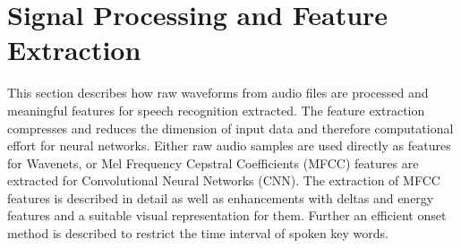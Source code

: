 
\chapter{Signal Processing and Feature Extraction}\label{sec:signal}
\thesisStateNew
This section describes how raw waveforms from audio files are processed and meaningful features for speech recognition extracted.
The feature extraction compresses and reduces the dimension of input data and therefore computational effort for neural networks.
Either raw audio samples are used directly as features for Wavenets, or Mel Frequency Cepstral Coefficients (MFCC) features are extracted for Convolutional Neural Networks (CNN).
The extraction of MFCC features is described in detail as well as enhancements with deltas and energy features and a suitable visual representation for them.
Further an efficient onset method is described to restrict the time interval of spoken key words. 






